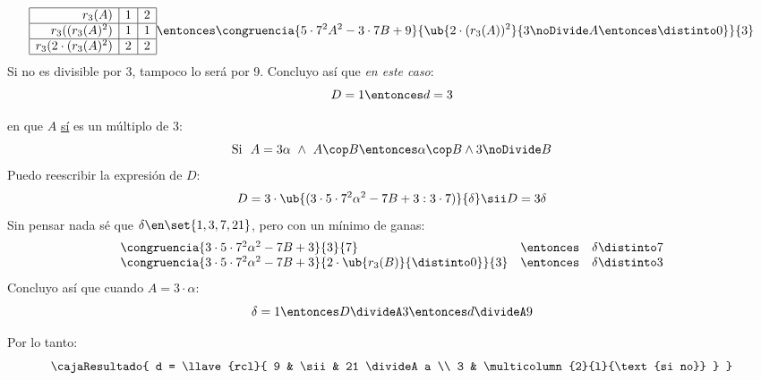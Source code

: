 $$
  \begin{array}{|r|c|c|c|} \hline
    r_3(A)                 & 1 & 2 \\\hline
    r_3((r_3(A)^2)         & 1 & 1 \\ \hline
    r_3(2 \cdot (r_3(A)^2) & 2 & 2 \\ \hline
  \end{array}
  \entonces
  \congruencia{5 \cdot 7^2 A^2 - 3 \cdot 7 B + 9}{\ub{2 \cdot (r_3(A))^2}{3 \noDivide A \entonces \distinto 0}}{3}
$$
Si no es divisible por 3, tampoco lo será por 9. Concluyo así que \textit{en este caso}:
$$
  D = 1 \entonces d = 3
$$

\bigskip

 en que $A$ \ul{sí} es un múltiplo de 3:
$$
  \text{Si} ~ ~ A = 3\alpha ~ \land ~ A \cop B \entonces \alpha \cop B \land 3 \noDivide B
$$
Puedo reescribir la expresión de $D$:
$$
  D = 3 \cdot \ub{(3 \cdot 5\cdot7^2 \alpha^2 - 7 B + 3: 3 \cdot 7)}{\delta} \sii D = 3 \delta
$$
Sin pensar nada sé que $\delta \en \set{1, 3, 7, 21}$, pero con un mínimo de ganas:
$$
  \begin{array}{lcl}
    \congruencia{3 \cdot 5 \cdot 7^2 \alpha^2 - 7 B + 3}{3}{7}                                & \entonces & \delta \distinto 7 \\
    \congruencia{3 \cdot 5 \cdot 7^2 \alpha^2 - 7 B + 3}{2 \cdot \ub{r_3(B)}{\distinto 0}}{3} & \entonces & \delta \distinto 3
  \end{array}
$$
Concluyo así que cuando $A = 3 \cdot \alpha$:
$$
  \delta = 1 \entonces D \divideA 3 \entonces d \divideA 9
$$

Por lo tanto:
$$
  \cajaResultado{
    d =
    \llave{rcl}{
      9 & \sii & 21 \divideA a \\
      3 & \multicolumn{2}{l}{\text{si no}}
    }
  }
$$

\begin{aportes}
  \item {}
\end{aportes}
